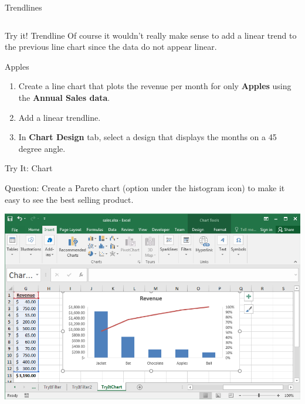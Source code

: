 \documentclass[xcolor=svgnames]{beamer}
\newcommand{\red}[1]{\textcolor{red}{#1}}
\begin{document}
\begin{frame}{Trendlines}
\begin{columns}[T]
\begin{column}{.48\textwidth}
\begin{center}
 \end{center}
\end{column}%
\end{columns}
\end{frame}

\begin{frame}{Try it! Trendline}
Of course it wouldn't really make sense to add a linear trend to the previous line chart since the data do not appear linear.
\begin{exampleblock}{Apples}
\begin{enumerate}
\item Create a line chart that plots the revenue per month for only {\bf Apples} using the {\bf Annual Sales data}. 
\item Add a linear trendline.
\item In {\bf Chart Design} tab, select a design that displays the months on a 45 degree angle. 
\end{enumerate}
\end{exampleblock}
\end{frame}


\begin{frame}{Try It: Chart}
\begin{exampleblock}
{Question:}  Create a Pareto chart (option under the histogram icon) to make it easy to see the best selling product.
\end{exampleblock}
 \begin{center}
        \includegraphics[width=.8\textwidth]{pareto}
 \end{center}
\end{frame}
\end{document}
